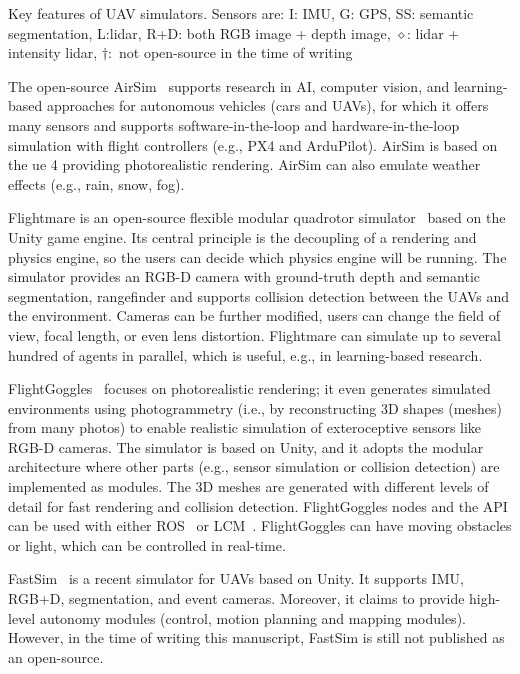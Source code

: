 \begin{table}
\centering
{\small
\setlength{\tabcolsep}{1pt}
\caption{\label{tab:comparison}
Key features of UAV simulators.
Sensors are: I: IMU, G: GPS, SS: semantic segmentation, L:\ac{lidar},
R+D: both RGB image + depth image, 
$\diamond$: \ac{lidar} + intensity \ac{lidar},
$\dagger:$ not open-source in the time of writing}
\vspace{-8pt}
  
}
\vspace{-2em}
\end{table}



  The open-source AirSim~\cite{madaan2020airsim} supports research in AI, computer vision, and learning-based approaches for autonomous vehicles (cars and UAVs), for which it offers many sensors  
  and supports software-in-the-loop and hardware-in-the-loop simulation
  with flight controllers (e.g., PX4 and ArduPilot).
  AirSim is based on the \ac{ue} 4 providing photorealistic rendering.
  AirSim can also emulate weather effects (e.g., rain, snow, fog).

  Flightmare is an open-source flexible modular quadrotor simulator~\cite{song2021flightmare} based on the Unity game engine.
  Its central principle is the decoupling of a rendering and physics engine, 
  so the users can decide which physics engine will be running.
  The simulator provides an RGB-D camera with ground-truth depth and semantic segmentation, rangefinder and supports collision detection between the UAVs and the environment.
  Cameras can be further modified, users can change the field of view, focal length, or even lens distortion.
  Flightmare can simulate up to several hundred of agents in parallel, which is useful, e.g., in learning-based research.

  FlightGoggles~\cite{guerra2019flighgoggles} focuses on photorealistic
  rendering; it even generates simulated environments 
  using photogrammetry (i.e., by reconstructing 3D shapes (meshes) from many photos) to enable realistic simulation of exteroceptive sensors like RGB-D cameras.
  The simulator is based on Unity, and it adopts the modular architecture where other parts (e.g., sensor simulation or collision detection) are implemented as modules.
  The 3D meshes are generated with different levels of detail for fast rendering and collision detection.
  FlightGoggles nodes and the API can be used with either ROS~\cite{quigley2009ros} or LCM~\cite{Moore2009LightweightCA}.
  FlightGoggles can have moving obstacles or light, which can be controlled in real-time.

  FastSim~\cite{cui2024fastsim} is a recent simulator for UAVs based on Unity.
  It supports IMU, RGB+D, segmentation, and event cameras.
  Moreover, it claims to provide high-level autonomy modules (control, motion planning and mapping modules).
  However, in the time of writing this manuscript, FastSim is still not published as an open-source.


